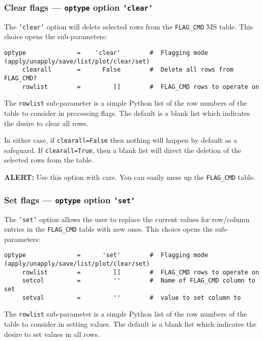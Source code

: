 \subsubsection{Clear flags --- {\tt optype} option {\tt 'clear'}}
\label{section:edit.flagcmd.optype.clear}

The {\tt 'clear'} option will delete selected rows from the 
{\tt FLAG\_CMD} MS table.
This choice opens the sub-parameters:
\small
\begin{verbatim}
optype              =    'clear'        #  Flagging mode (apply/unapply/save/list/plot/clear/set)
     clearall       =      False        #  Delete all rows from FLAG_CMD?
     rowlist        =         []        #  FLAG_CMD rows to operate on
\end{verbatim}
\normalsize

The {\tt rowlist} sub-parameter is a simple Python list of the row
numbers of the table to consider in processing flags.  The default is
a blank list which indicates the desire to clear all rows.

In either case, if {\tt clearall=False} then nothing will
happen by default as a safeguard.  If {\tt clearall=True}, then a 
blank list will direct the deletion of the selected rows from the table.

{\bf ALERT:} Use this option with care.  You can easily mess up the
{\tt FLAG\_CMD} table.

\subsubsection{Set flags --- {\tt optype} option {\tt 'set'}}
\label{section:edit.flagcmd.optype.set}

The {\tt 'set'} option allows the user to replace the current values
for row/column entries in the {\tt FLAG\_CMD} table with new ones.
This choice opens the sub-parameters:
\small
\begin{verbatim}
optype              =      'set'        #  Flagging mode (apply/unapply/save/list/plot/clear/set)
     rowlist        =         []        #  FLAG_CMD rows to operate on
     setcol         =         ''        #  Name of FLAG_CMD column to set
     setval         =         ''        #  value to set column to
\end{verbatim}
\normalsize

The {\tt rowlist} sub-parameter is a simple Python list of the row
numbers of the table to consider in setting values.  The default is
a blank list which indicates the desire to set values in all rows.

